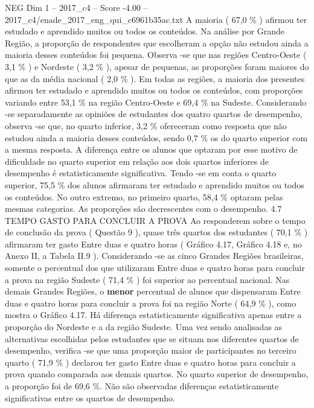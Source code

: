 \begin{textsample}{NEG Dim 1 – 2017\_c4 – Score -4.00 – 2017\_c4/enade\_2017\_eng\_qui\_c6961b35ac.txt}
A maioria ( 67,0 \% ) afirmou ter estudado e aprendido muitos ou todos os conteúdos.
Na análise por Grande Região, a proporção de respondentes que escolheram a opção não estudou ainda a maioria desses conteúdos foi pequena.
Observa -se que nas regiões Centro-Oeste ( 3,1 \% ) e Nordeste ( 3,2 \% ), apesar de pequenas, as proporções foram maiores do que as da média nacional ( 2,0 \% ).
Em todas as regiões, a maioria dos presentes afirmou ter estudado e aprendido muitos ou todos os conteúdos, com proporções variando entre 53,1 \% na região Centro-Oeste e 69,4 \% na Sudeste.
Considerando -se separadamente as opiniões de estudantes dos quatro quartos de desempenho, observa -se que, no quarto inferior, 3,2 \% ofereceram como resposta que não estudou ainda a maioria desses conteúdos, sendo 0,7 \% os do quarto superior com a mesma resposta.
A diferença entre os alunos que optaram por esse motivo de dificuldade no quarto superior em relação aos dois quartos inferiores de desempenho é estatisticamente significativa.
Tendo -se em conta o quarto superior, 75,5 \% dos alunos afirmaram ter estudado e aprendido muitos ou todos os conteúdos.
No outro extremo, no primeiro quarto, 58,4 \% optaram pelas mesmas categorias.
As proporções são decrescentes com o desempenho. 4.7 TEMPO GASTO PARA CONCLUIR A PROVA Ao responderem sobre o tempo de conclusão da prova ( Questão 9 ), quase três quartos dos estudantes ( 70,1 \% ) afirmaram ter gasto Entre duas e quatro horas ( Gráfico 4.17, Gráfico 4.18 e, no Anexo II, a Tabela II.9 ).
Considerando -se as cinco Grandes Regiões brasileiras, somente o percentual dos que utilizaram Entre duas e quatro horas para concluir a prova na região Sudeste ( 71,4 \% ) foi superior ao percentual nacional.
Nas demais Grandes Regiões, o \textbf{menor} percentual de alunos que dispensaram Entre duas e quatro horas para concluir a prova foi na região Norte ( 64,9 \% ), como mostra o Gráfico 4.17.
Há diferença estatisticamente significativa apenas entre a proporção do Nordeste e a da região Sudeste.
Uma vez sendo analisadas as alternativas escolhidas pelos estudantes que se situam nos diferentes quartos de desempenho, verifica -se que uma proporção maior de participantes no terceiro quarto ( 71,9 \% ) declarou ter gasto Entre duas e quatro horas para concluir a prova quando comparada aos demais quartos.
No quarto superior de desempenho, a proporção foi de 69,6 \%.
Não são observadas diferenças estatisticamente significativas entre os quartos de desempenho.

\end{textsample}
